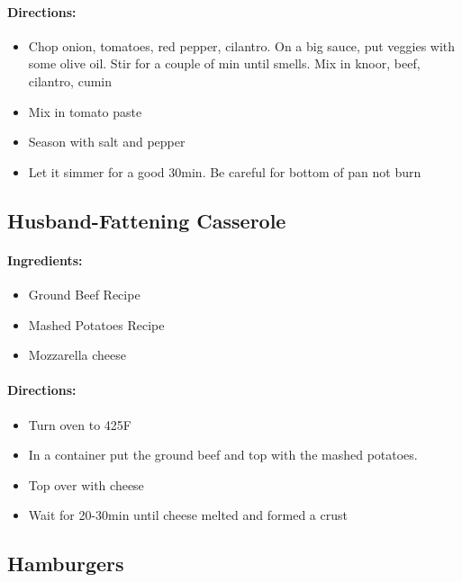 \documentclass{article}
\begin{document}
\paragraph{Directions:}
\begin{itemize}
    \item Chop onion, tomatoes, red pepper, cilantro. On a big sauce, put veggies with some olive oil. Stir for a couple of min until smells. Mix in knoor, beef, cilantro, cumin
    \item Mix in tomato paste
    \item Season with salt and pepper
    \item Let it simmer for a good 30min. Be careful for bottom of pan not burn
\end{itemize}

\subsection{Husband-Fattening Casserole}

\paragraph{Ingredients:}
\begin{itemize}
    \item Ground Beef Recipe
    \item Mashed Potatoes Recipe
    \item Mozzarella cheese
\end{itemize}

\paragraph{Directions:}
\begin{itemize}
    \item Turn oven to 425F
    \item In a container put the ground beef and top with the mashed potatoes.
    \item Top over with cheese
    \item Wait for 20-30min until cheese melted and formed a crust
\end{itemize}

\subsection{Hamburgers}
\end{document}
